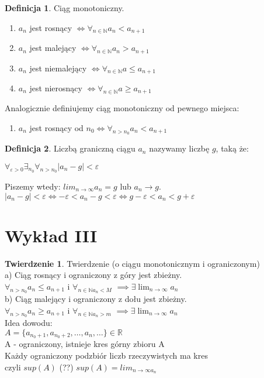 \documentclass{article}
\theoremstyle{definition}
\newtheorem{de}{Definicja}[subsection]
\theoremstyle{definition}
\newtheorem{tw}{Twierdzenie}[subsection]
\theoremstyle{definition}
\theoremstyle{definition}
\begin{document}
\begin{de}
    Ciąg monotoniczny. 
    \begin{enumerate}
        \item $a_n$ jest rosnący $\iff \forall_{n\in\mathbb{N}} a_n<a_{n+1}$
        \item $a_n$ jest malejący $\iff \forall_{n\in\mathbb{N}} a_n>a_{n+1}$
        \item $a_n$ jest niemalejący $\iff \forall_{n\in\mathbb{N}} a\leq a_{n+1}$
        \item $a_n$ jest nierosnący $\iff \forall_{n\in\mathbb{N}} a\geq a_{n+1}$
    \end{enumerate}
    Analogicznie definiujemy ciąg monotoniczny od pewnego miejsca:
    \begin{enumerate}
        \item $a_n$ jest rosnący od $n_0 \iff \forall_{n>n_0} a_n<a_{n+1}$
    \end{enumerate}
\end{de}

\begin{de}
    Liczbą graniczną ciągu $a_n$ nazywamy liczbę $g$, taką że:
    \begin{center}
        $\forall_{\varepsilon>0}\exists_{n_0}\forall_{n>n_0} |a_n-g|<\varepsilon$
    \end{center}
    Piszemy wtedy: $lim_{n\rightarrow \infty} a_n = g$ lub $a_n\rightarrow g$.\\
    $|a_n-g|<\varepsilon \iff -\varepsilon < a_n -g < \varepsilon \iff g-\varepsilon < a_n < g+\varepsilon$
\end{de}

\section{Wykład III}

\begin{tw}
Twierdzenie (o ciągu monotonicznym i ograniczonym)\\
a) Ciąg rosnący i ograniczony z góry jest zbieżny.\\
$\forall_{n>n_0} a_n\leq a_{n+1}$ i $\forall_{n\in \mathbb{N} a_n< M}$ $\implies \exists \lim_{n\rightarrow \infty} a_n$\\
b) Ciąg malejący i ograniczony z dołu jest zbieżny.\\
$\forall_{n>n_0} a_n\geq a_{n+1}$ i $\forall_{n\in \mathbb{N} a_n> m}$ $\implies \exists \lim_{n\rightarrow \infty} a_n$\\
Idea dowodu:\\
$A=\{a_{n_0+1},a_{n_0+2},\dots,a_n,\dots\} \in \mathbb{R}$\\
A - ograniczony, istnieje kres górny zbioru A\\
Każdy ograniczony podzbiór liczb rzeczywistych ma kres\\
czyli $sup(A)$ (??) $sup(A)=lim_{n\rightarrow \infty a_n}$
\end{tw}
\end{document}
